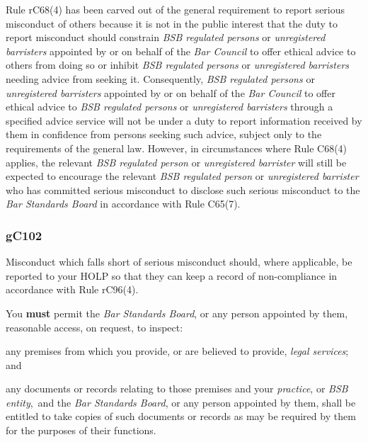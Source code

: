 Rule rC68(4) has been carved out of the general requirement to report
serious misconduct of others because it is not in the public interest
that the duty to report misconduct should constrain \emph{BSB regulated
persons} or \emph{unregistered barristers} appointed by or on behalf of
the \emph{Bar Council} to offer ethical advice to others from doing so
or inhibit \emph{BSB regulated persons} or \emph{unregistered
barristers} needing advice from seeking it. Consequently, \emph{BSB
regulated persons} or \emph{unregistered barristers} appointed by or on
behalf of the \emph{Bar Council} to offer ethical advice to \emph{BSB
regulated persons} or \emph{unregistered barristers} through a specified
advice service will not be under a duty to report information received
by them in confidence from persons seeking such advice, subject only to
the requirements of the general law. However, in circumstances where
Rule C68(4) applies, the relevant \emph{BSB regulated person} or
\emph{unregistered barrister} will still be expected to encourage the
relevant \emph{BSB regulated person} or \emph{unregistered barrister}
who has committed serious misconduct to disclose such serious misconduct
to the \emph{Bar Standards Board} in accordance with Rule C65(7).

\subsubsection{\color{darkgrey}gC102}

Misconduct which falls short of serious misconduct should, where
applicable, be reported to your HOLP so that they can keep a record of
non-compliance in accordance with Rule rC96(4).




You \textcolor{myred}{\textbf{must}} permit the \emph{Bar Standards Board}, or any person appointed
by them, reasonable access, on request, to inspect:
\begin{numlist}
\item any premises from which you provide, or are believed to provide,
\emph{legal services}; and

\item any documents or records relating to those premises and your
\emph{practice}, or \emph{BSB entity},~and the \emph{Bar Standards
Board}, or any person appointed by them, shall be entitled to take
copies of such documents or records as may be required by them for the
purposes of their functions.
\end{numlist}


